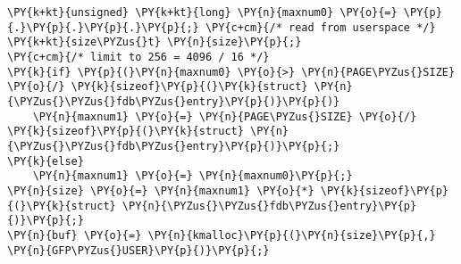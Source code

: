 \begin{Verbatim}[commandchars=\\\{\}]
\PY{k+kt}{unsigned} \PY{k+kt}{long} \PY{n}{maxnum0} \PY{o}{=} \PY{p}{.}\PY{p}{.}\PY{p}{.}\PY{p}{;} \PY{c+cm}{/* read from userspace */} 
\PY{k+kt}{size\PYZus{}t} \PY{n}{size}\PY{p}{;}
\PY{c+cm}{/* limit to 256 = 4096 / 16 */}
\PY{k}{if} \PY{p}{(}\PY{n}{maxnum0} \PY{o}{>} \PY{n}{PAGE\PYZus{}SIZE} \PY{o}{/} \PY{k}{sizeof}\PY{p}{(}\PY{k}{struct} \PY{n}{\PYZus{}\PYZus{}fdb\PYZus{}entry}\PY{p}{)}\PY{p}{)}
    \PY{n}{maxnum1} \PY{o}{=} \PY{n}{PAGE\PYZus{}SIZE} \PY{o}{/} \PY{k}{sizeof}\PY{p}{(}\PY{k}{struct} \PY{n}{\PYZus{}\PYZus{}fdb\PYZus{}entry}\PY{p}{)}\PY{p}{;}
\PY{k}{else}
    \PY{n}{maxnum1} \PY{o}{=} \PY{n}{maxnum0}\PY{p}{;}
\PY{n}{size} \PY{o}{=} \PY{n}{maxnum1} \PY{o}{*} \PY{k}{sizeof}\PY{p}{(}\PY{k}{struct} \PY{n}{\PYZus{}\PYZus{}fdb\PYZus{}entry}\PY{p}{)}\PY{p}{;}
\PY{n}{buf} \PY{o}{=} \PY{n}{kmalloc}\PY{p}{(}\PY{n}{size}\PY{p}{,} \PY{n}{GFP\PYZus{}USER}\PY{p}{)}\PY{p}{;}
\end{Verbatim}
